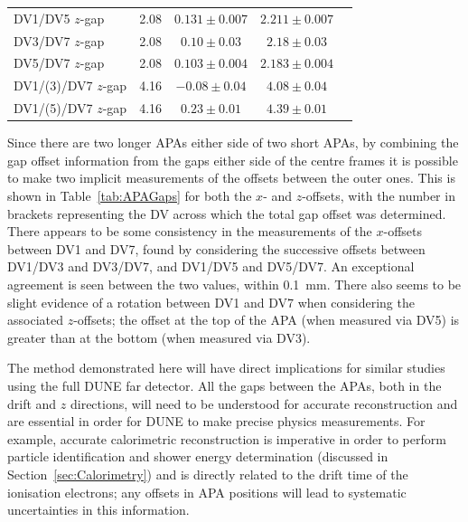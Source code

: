 \begin{table}
\begin{tabular}{l  c  c  c  c }
      DV1/DV5 $z$-gap & 2.08 & $0.131 \pm 0.007$ & $2.211 \pm 0.007$ \\
      DV3/DV7 $z$-gap & 2.08 & $0.10  \pm 0.03$  & $2.18  \pm 0.03$  \\
      DV5/DV7 $z$-gap & 2.08 & $0.103 \pm 0.004$ & $2.183 \pm 0.004$ \\
      \midrule
      DV1/(3)/DV7 $z$-gap & 4.16 & $-0.08 \pm 0.04$ & $4.08 \pm 0.04$ \\
      DV1/(5)/DV7 $z$-gap & 4.16 & $0.23  \pm 0.01$ & $4.39 \pm 0.01$ \\
      \bottomrule
    \end{tabular}
\end{table}

Since there are two longer APAs either side of two short APAs, by combining the gap offset information from the gaps either side of the centre frames it is possible to make two implicit measurements of the offsets between the outer ones.  This is shown in Table~\ref{tab:APAGaps} for both the $x$- and $z$-offsets, with the number in brackets representing the DV across which the total gap offset was determined.  There appears to be some consistency in the measurements of the $x$-offsets between DV1 and DV7, found by considering the successive offsets between DV1/DV3 and DV3/DV7, and DV1/DV5 and DV5/DV7.  An exceptional agreement is seen between the two values, within 0.1~mm.  There also seems to be slight evidence of a rotation between DV1 and DV7 when considering the associated $z$-offsets; the offset at the top of the APA (when measured via DV5) is greater than at the bottom (when measured via DV3).  %

The method demonstrated here will have direct implications for similar studies using the full DUNE far detector.  All the gaps between the APAs, both in the drift and $z$ directions, will need to be understood for accurate reconstruction and are essential in order for DUNE to make precise physics measurements.  For example, accurate calorimetric reconstruction is imperative in order to perform particle identification and shower energy determination (discussed in Section~\ref{sec:Calorimetry}) and is directly related to the drift time of the ionisation electrons; any offsets in APA positions will lead to systematic uncertainties in this information.


